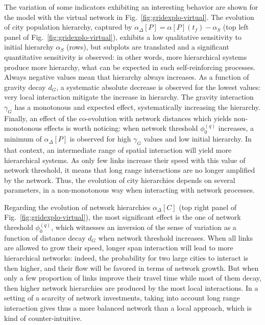 \documentclass[11pt]{article}
\begin{document}
The variation of some indicators exhibiting an interesting behavior are shown for the model with the virtual network in Fig.~\ref{fig:gridexplo-virtual}. The evolution of city population hierarchy, captured by $\alpha_{\Delta}\left[P\right] = \alpha \left[P\right](t_f) - \alpha_S$ (top left panel of Fig.~\ref{fig:gridexplo-virtual}), exhibits a low qualitative sensitivity to initial hierarchy $\alpha_S$ (rows), but subplots are translated and a significant quantitative sensitivity is observed: in other words, more hierarchical systems produce more hierarchy, what can be expected in such self-reinforcing processes. Always negative values mean that hierarchy always increases. As a function of gravity decay $d_G$, a systematic absolute decrease is observed for the lowest values: very local interaction mitigate the increase in hierarchy. The gravity interaction $\gamma_G$ has a monotonous and expected effect, systematically increasing the hierarchy. Finally, an effect of the co-evolution with network distances which yields non-monotonous effects is worth noticing: when network threshold $\phi_0^{(q)}$ increases, a minimum of $\alpha_{\Delta}\left[P\right]$ is observed for high $\gamma_G$ values and low initial hierarchy. In that context, an intermediate range of spatial interaction will yield more hierarchical systems. As only few links increase their speed with this value of network threshold, it means that long range interactions are no longer amplified by the network. Thus, the evolution of city hierarchies depends on several parameters, in a non-monotonous way when interacting with network processes.

Regarding the evolution of network hierarchies $\alpha_{\Delta}\left[C\right]$ (top right panel of Fig.~\ref{fig:gridexplo-virtual}), the most significant effect is the one of network threshold $\phi_0^{(q)}$, which witnesses an inversion of the sense of variation as a function of distance decay $d_G$ when network threshold increases. When all links are allowed to grow their speed, longer span interaction will lead to more hierarchical networks: indeed, the probability for two large cities to interact is then higher, and their flow will be favored in terms of network growth. But when only a few proportion of links improve their travel time while most of them decay, then higher network hierarchies are produced by the most local interactions. In a setting of a scarcity of network investments, taking into account long range interaction gives thus a more balanced network than a local approach, which is kind of counter-intuitive.
\end{document}
